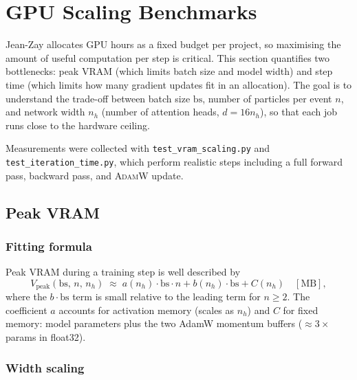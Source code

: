 
\section{GPU Scaling Benchmarks}

Jean-Zay allocates GPU hours as a fixed budget per project, so
maximising the amount of useful computation per step is critical.
This section quantifies two bottlenecks: peak VRAM (which limits
batch size and model width) and step time (which limits how many
gradient updates fit in an allocation).  The goal is to understand
the trade-off between batch size $\mathrm{bs}$, number of particles
per event $n$, and network width $n_h$ (number of attention heads,
$d = 16 n_h$), so that each job runs close to the hardware ceiling.

Measurements were collected with \texttt{test\_vram\_scaling.py} and
\texttt{test\_iteration\_time.py}, which perform realistic steps
including a full forward pass, backward pass, and \textsc{AdamW}
update.

\subsection{Peak VRAM}

\subsubsection{Fitting formula}

Peak VRAM during a training step is well described by
\begin{equation}
  V_\text{peak}(\mathrm{bs},\, n,\, n_h)
    \;\approx\; a(n_h)\cdot\mathrm{bs}\cdot n
              + b(n_h)\cdot\mathrm{bs}
              + C(n_h)
  \quad [\text{MB}],
  \label{eq:vram}
\end{equation}
where the $b\cdot\mathrm{bs}$ term is small relative to the leading
term for $n\geq 2$.  The coefficient $a$ accounts for activation
memory (scales as $n_h$) and $C$ for fixed memory: model parameters
plus the two AdamW momentum buffers ($\approx 3\times$ params in
float32).

\subsubsection{Width scaling}

